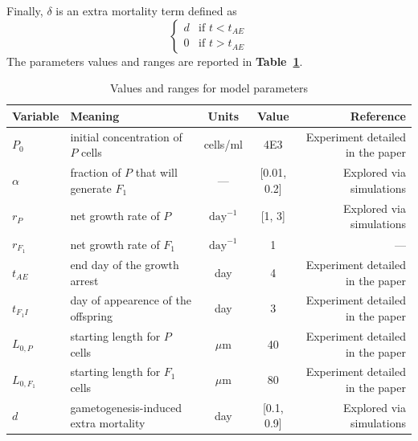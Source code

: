 \documentclass[a4paper,oneside]{article}
\begin{document}
    Finally, $\delta$ is an extra mortality term defined as
    \[
      \begin{cases}
        d & \mbox{if } t < t_{AE} \\
        0 & \mbox{if } t > t_{AE}
      \end{cases}
    \]
    The parameters values and ranges are reported in \textbf{Table~\ref{tbl1}}.
    \begin{table}
      \centering
      {%
        \begin{tabular}{@{}llccr@{}}
          \toprule
          \textbf{Variable}&\textbf{Meaning} & \textbf{Units} & \textbf{Value} & \textbf{Reference}\\
          \midrule
          ${P}_{0}$       & initial concentration of $P$ cells         & cells/ml          & 4E3         & Experiment detailed in the paper\\
          $\alpha$        & fraction of $P$ that will generate $F_{1}$ & ---               & [0.01, 0.2] & Explored via simulations\\
          $r_{P}$         & net growth rate of $P$                     & $\text{day}^{-1}$ & [1, 3]      & Explored via simulations\\ 
          $r_{F_{1}}$     & net growth rate of $F_{1}$                 & $\text{day}^{-1}$ & 1           & ---\\
          $t_{AE}$        & end day of the growth arrest               & day               & 4           & Experiment detailed in the paper\\
          $t_{F_{1}I}$    & day of appearence of the offspring         & day               & 3           & Experiment detailed in the paper\\
          $L_{0,P}$       & starting length for $P$ cells              & $\mu$m            & 40          & Experiment detailed in the paper\\
          $L_{0,{F_{1}}}$ & starting length for $F_{1}$ cells          & $\mu$m            & 80          & Experiment detailed in the paper\\
          $d$             & gametogenesis-induced extra mortality      & day               & [0.1, 0.9]  & Explored via simulations\\
          \bottomrule
        \end{tabular}
       }
      \caption{Values and ranges for model parameters}\label{tbl1}
    \end{table}
%
\end{document}
